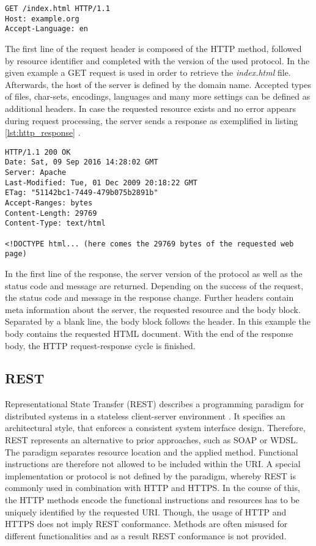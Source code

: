 \begin{lstlisting}[caption={Example for HTTP GET request}, label={lst:http_request}]
GET /index.html HTTP/1.1
Host: example.org
Accept-Language: en
\end{lstlisting}

The first line of the request header is composed of the HTTP method, followed by resource identifier and completed with the version of the used protocol. In the given example a  GET request is used in order to retrieve the \textit{index.html} file. Afterwards, the host of the server is defined by the domain name. Accepted types of files, char-sets, encodings, languages and many more settings can be defined as additional headers. In case the requested resource exists and no error appears during request processing, the server sends a response as exemplified in listing \ref{lst:http_response} \cite{MDN:2016}. \\

\begin{lstlisting}[caption={Example for HTTP GET response}, label={lst:http_response}]
HTTP/1.1 200 OK
Date: Sat, 09 Sep 2016 14:28:02 GMT
Server: Apache
Last-Modified: Tue, 01 Dec 2009 20:18:22 GMT
ETag: "51142bc1-7449-479b075b2891b"
Accept-Ranges: bytes
Content-Length: 29769
Content-Type: text/html

<!DOCTYPE html... (here comes the 29769 bytes of the requested web page)
\end{lstlisting}

In the first line of the response, the server version of the protocol as well as the status code and message are returned. Depending on the success of the request, the status code and message in the response change. Further headers contain meta information about the server, the requested resource and the body block. Separated by a blank line, the body block follows the header. In this example the body contains the requested HTML document. With the end of the response body, the HTTP request-response cycle is finished.

\subsection{REST}
Representational State Transfer (REST) describes a programming paradigm for distributed systems in a stateless client-server environment \cite{Fielding:2000}. It specifies an architectural style, that enforces a consistent system interface design. Therefore, REST represents an alternative to prior approaches, such as SOAP or WDSL. The paradigm separates resource location and the applied method. Functional instructions are therefore not allowed to be included within the URI. A special implementation or protocol is not defined by the paradigm, whereby REST is commonly used in combination with HTTP and HTTPS. In the course of this, the HTTP methods encode the functional instructions and resources has to be uniquely identified by the requested URI. Though, the usage of HTTP and HTTPS does not imply REST conformance. Methods are often misused for different functionalities and as a result REST conformance is not provided.

